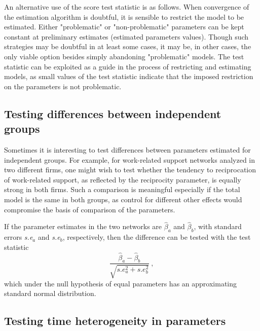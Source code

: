 \documentclass[a4paper,fleqn,11pt]{article}
\newcommand{\+}{\, + \,}
\begin{document}
An alternative use of the score test statistic is as follows. When
convergence of the estimation algorithm is doubtful, it is sensible
to restrict the model to be estimated. Either "problematic" or
"non-problematic" parameters can be kept constant at preliminary
estimates (estimated parameters values). Though such strategies may
be doubtful in at least some cases, it may be, in other cases, the
only viable option besides simply abandoning "problematic" models.
The test statistic can be exploited as a guide in the process of
restricting and estimating models, as small values of the test
statistic indicate that the imposed restriction on the parameters is
not problematic.

\subsection{Testing differences between independent groups}

Sometimes it is interesting to test differences between parameters estimated for
independent groups. For example, for work-related support networks analyzed in
two different firms, one might wish to test whether the tendency to
reciprocation of work-related support, as reflected by the reciprocity
parameter, is equally strong in both firms.  Such a comparison is meaningful
especially if the total model is the same in both groups, as control for
different other effects would compromise the basis of comparison of the
parameters.

If the parameter estimates in the two networks are $\hat\beta_a$ and $\hat\beta_b$,
with standard errors \textit{s.e}$_a$ and  \textit{s.e}$_b$, respectively,
then the difference can be tested with the test statistic
\begin{equation}
    \frac{\hat\beta_a  - \hat\beta_b}{\sqrt{s.e_a^2 + s.e_b^2}} \ ,
\end{equation}
which under the null hypothesis of equal parameters has an approximating
standard normal distribution.

\newpage
\subsection{Testing time heterogeneity in parameters}
\label{S_timetest2}
\end{document}
